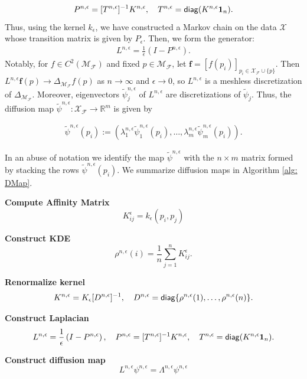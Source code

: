 \documentclass[reqno, 12pt]{article}
\begin{document}
$$
P^{n,\epsilon} = [T^{n,\epsilon}]^{-1}K^{n,\epsilon}, \quad T^{n,\epsilon} = {\sf diag}(K^{n,\epsilon}\mathbf{1}_n). 
$$
Thus, using the kernel $k_{\epsilon}$, we have constructed a Markov chain on the data $\mathcal{X}$ whose transition matrix is given by $P_{\epsilon}$. Then, we form the generator: 
\begin{align}
    L^{n,\epsilon} = \frac{1}{\epsilon}\left(I - P^{n,\epsilon}\right). \label{eq: tmdmap generator}
\end{align}
Notably, for $f \in C^2(\mathcal{M}_{\mathcal{F}})$ and fixed $p \in \mathcal{M}_{\mathcal{F}}$, let $\mathbf{f} = [f(p_i)]_{p_i \in \mathcal{X}_{\mathcal{F}} \cup \{p\}}$. Then $L^{n,\epsilon}\mathbf{f}(p) \to \Delta_{\mathcal{M}_{\mathcal{F}}}f(p)$ as $n \to \infty$ and $\epsilon \to 0$, so $L^{n, \epsilon}$ is a meshless discretization of $\Delta_{\mathcal{M}_{\mathcal{F}}}$. Moreover, eigenvectors $\tilde{\psi}^{n,\epsilon}_j$ of $L^{n,\epsilon}$ are discretizations of $\tilde{\psi}_j$. Thus, the diffusion map $\tilde{\psi}^{n,\epsilon}: \mathcal{X}_{\mathcal{F}} \to \mathbb{R}^m$ is given by 

\begin{align}
    \tilde{\psi}^{n,\epsilon}(p_i) := \left(\lambda^{n,\epsilon}_{1}\tilde{\psi}^{n,\epsilon}_{1}(p_i), \ldots, \lambda^{n,\epsilon}_{m}\tilde{\psi}^{n,\epsilon}_{m}(p_i)\right).
\end{align}

In an abuse of notation we identify the map $\tilde{\psi}^{n,\epsilon}$ with the $n \times m$ matrix formed by stacking the rows $\tilde{\psi}^{n,\epsilon}(p_i)$. We summarize diffusion maps in Algorithm \eqref{alg: DMap}. 

\begin{algorithm}[h]
    \caption{Diffusion Maps}
    
    \textbf{Compute Affinity Matrix}
    $$K^{\epsilon}_{ij} = k_{\epsilon}(p_i,p_j)$$
    
    \textbf{Construct KDE}
    $$\rho^{n,\epsilon}(i) = \frac{1}{n}\sum_{j=1}^n K^{\epsilon}_{ij}.$$
    
    \textbf{Renormalize kernel}
    $$K^{n,\epsilon} = K_{\epsilon}[D^{n,\epsilon}]^{-1},\quad D^{n,\epsilon} = {\sf diag}\{\rho^{n,\epsilon}(1),\ldots,\rho^{n,\epsilon}(n)\}.$$
        
    \textbf{Construct Laplacian}
    $$L^{n,\epsilon} = \frac{1}{\epsilon}\left(I - P^{n,\epsilon}\right), \quad P^{n,\epsilon} = [T^{n,\epsilon}]^{-1}K^{n,\epsilon}, \quad T^{n,\epsilon} = {\sf diag}(K^{n,\epsilon}\mathbf{1}_n). $$

    \textbf{Construct diffusion map}
    $$ L^{n,\epsilon} \psi^{n,\epsilon} = \Lambda^{n,\epsilon}\psi^{n,\epsilon}$$
    
    \label{alg: DMap}
\end{algorithm}
\end{document}
